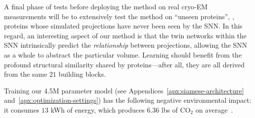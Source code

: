 A final phase of tests before deploying the method on real cryo-EM measurements will be to extensively test the method on ``unseen proteins'', \ie, proteins whose simulated projections have never been seen by the SNN\@.
In this regard, an interesting aspect of our method is that the twin networks within the SNN intrinsically predict the \textit{relationship} between projections, allowing the SNN as a whole to abstract the particular volume.
Learning should benefit from the profound structural similarity shared by proteins---after all, they are all derived from the same $21$ building blocks.

Training our 4.5M parameter model (see Appendices~\ref{apx:siamese-architecture} and~\ref{apx:optimization-settings}) has the following negative environmental impact: it consumes $13$ kWh of energy, which produces $6.36$ lbs of $\text{CO}_2$ on average~\cite{Strubell_Ganesh_McCallum_2020}.

